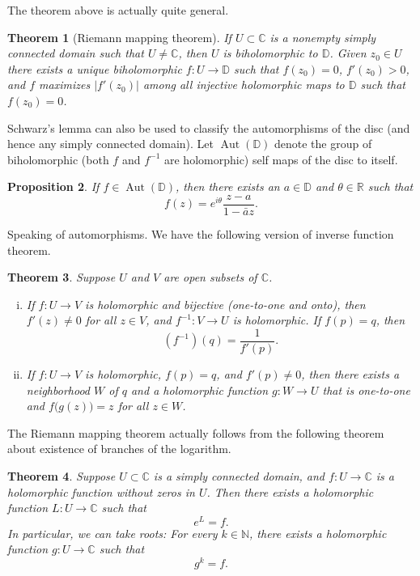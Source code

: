 \documentclass[12pt,openany]{book}
\newcommand{\Aut}{\operatorname{Aut}}
\newcommand{\sabs}[1]{\lvert {#1} \rvert}
\newcommand{\C}{{\mathbb{C}}}
\newcommand{\R}{{\mathbb{R}}}
\newcommand{\N}{{\mathbb{N}}}
\newcommand{\D}{{\mathbb{D}}}
\theoremstyle{plain}
\newtheorem{thm}{Theorem}[section]
\newtheorem{prop}[thm]{Proposition}
\theoremstyle{remark}
\theoremstyle{definition}
\theoremstyle{exercise}
\theoremstyle{example}
\begin{document}
The theorem above is actually quite general.

\begin{thm}[Riemann mapping theorem]
If $U \subset \C$ is a nonempty simply connected domain such that $U \neq \C$,
then $U$ is biholomorphic to $\D$.  Given $z_0 \in U$
there exists a unique biholomorphic $f \colon U \to \D$
such that $f(z_0) = 0$, $f'(z_0) > 0$, and $f$
maximizes $\sabs{f'(z_0)}$ among all injective holomorphic maps to $\D$ such
that $f(z_0) = 0$.
\end{thm}

Schwarz's lemma can also be used to classify the automorphisms of the disc
(and hence any simply connected domain).  Let
$\Aut(\D)$ denote the group of biholomorphic (both $f$ and
$f^{-1}$ are holomorphic) self maps of the
disc to itself.

\begin{prop}
If $f \in \Aut(\D)$, then there exists an $a \in \D$
and $\theta \in \R$ such that
\begin{equation*}
f(z) = e^{i\theta} \frac{z-a}{1-\bar{a}z} .
\end{equation*}
\end{prop}

Speaking of automorphisms.  We have the following
version of inverse function theorem.

\begin{thm}
Suppose $U$ and $V$ are open subsets of $\C$.
\begin{enumerate}[(i)]
\item
If $f \colon U \to V$ is holomorphic and bijective (one-to-one and onto),
then $f'(z) \not= 0$ for all $z \in V$, and $f^{-1} \colon V \to U$
is holomorphic.  If $f(p) = q$, then
\begin{equation*}
\left(f^{-1}\right)(q) = \frac{1}{f'(p)} .
\end{equation*}
\item
If $f \colon U \to V$ is holomorphic, $f(p) = q$,
and $f'(p) \not= 0$, then there exists a neighborhood $W$ of $q$
and a holomorphic function $g \colon W \to U$ that is
one-to-one and $f\bigl(g(z)\bigr) = z$ for all $z \in W$.
\end{enumerate}
\end{thm}

\pagebreak[2]
The Riemann mapping theorem actually follows from the following
theorem about existence of branches of the logarithm.

\begin{thm}
Suppose $U \subset \C$ is a simply connected domain, and $f \colon U \to \C$
is a holomorphic function without zeros in $U$.  Then there exists a
holomorphic function $L \colon U \to \C$ such that
\begin{equation*}
e^L = f .
\end{equation*}
In particular, we can take roots:
For every $k \in \N$, there exists a holomorphic function
$g \colon U \to \C$ such that
\begin{equation*}
g^k = f .
\end{equation*}
\end{thm}
\end{document}
